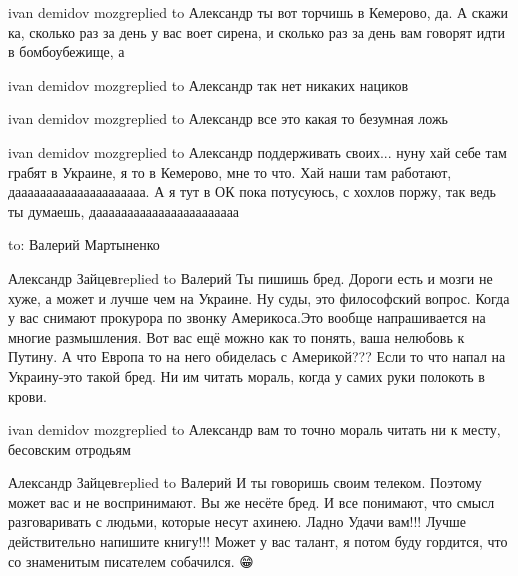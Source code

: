 ivan demidov mozgreplied to Александр
ты вот торчишь в Кемерово, да. А скажи ка, сколько раз за день у вас воет сирена, и сколько раз за день вам говорят идти в бомбоубежище, а

ivan demidov mozgreplied to Александр
так нет никаких нациков

ivan demidov mozgreplied to Александр
все это какая то безумная ложь

ivan demidov mozgreplied to Александр
поддерживать своих... нуну хай себе там грабят в Украине, я то в Кемерово, мне то что. Хай наши там работают, дааааааааааааааааааааа. А я тут в ОК пока потусуюсь, с хохлов поржу, так ведь ты думаешь, дааааааааааааааааааааааа

to: Валерий Мартыненко

Александр Зайцевreplied to Валерий
Ты пишишь бред. Дороги есть и мозги не хуже, а может и лучше чем на Украине. Ну суды, это философский вопрос. Когда у вас снимают прокурора по звонку Америкоса.Это вообще напрашивается на многие размышления. Вот вас ещё можно как то понять, ваша нелюбовь к Путину. А что Европа то на него обиделась с Америкой??? Если то что напал на Украину-это такой бред. Ни им читать мораль, когда у самих руки полокоть в крови.

ivan demidov mozgreplied to Александр
вам то точно мораль читать ни к месту, бесовским отродьям

Александр Зайцевreplied to Валерий
И ты говоришь своим телеком. Поэтому может вас и не воспринимают. Вы же несёте бред. И все понимают, что смысл разговаривать с людьми, которые несут ахинею. Ладно Удачи вам!!! Лучше действительно напишите книгу!!! Может у вас талант, я потом буду гордится, что со знаменитым писателем собачился. 😁
